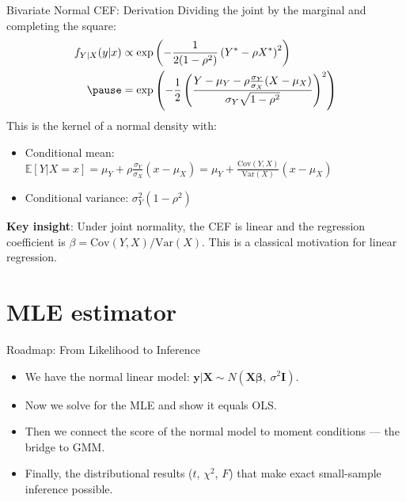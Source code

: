 \documentclass[aspectratio=169, handout, t]{beamer}
\numberwithin{equation}{section}
\begin{document}
\begin{frame}{Bivariate Normal CEF: Derivation}
Dividing the joint by the marginal and completing the square:
\begin{align*}
f_{Y|X}(y|x)&\propto \exp\left( -\frac{1}{2(1 - \rho^2)} \left( Y^* - \rho X^* \right)^2 \right)\\\pause
&= \exp\left( -\frac{1}{2} \left( \frac{Y - \mu_Y - \rho \frac{\sigma_Y}{\sigma_X}(X - \mu_X)}{\sigma_Y \sqrt{1 - \rho^2}} \right)^2 \right)
\end{align*}\pause
This is the kernel of a normal density with:
\begin{itemize}
\item Conditional mean: $\mathbb{E}[Y|X=x]=\mu_Y+\rho\frac{\sigma_Y}{\sigma_X}(x-\mu_X)=\mu_Y+\frac{\text{Cov}(Y,X)}{\text{Var}(X)}(x-\mu_X)$
\item Conditional variance: $\sigma_Y^2(1-\rho^2)$
\end{itemize}\pause
\medskip
\textbf{Key insight}: Under joint normality, the CEF is \alert{linear} and the regression coefficient is $\beta = \text{Cov}(Y,X)/\text{Var}(X)$.  This is a classical motivation for linear regression.
\end{frame}

\section{MLE estimator}

\begin{frame}{Roadmap: From Likelihood to Inference}
\begin{itemize}\setlength{\itemsep}{6pt}
\item We have the normal linear model: $\bm{y}|\bm{X}\sim N(\bm{X\beta},\ \sigma^2\bm{I})$.\pause
\item Now we solve for the MLE and show it equals OLS.\pause
\item Then we connect the \alert{score} of the normal model to moment conditions --- the bridge to GMM.\pause
\item Finally, the distributional results ($t$, $\chi^2$, $F$) that make exact small-sample inference possible.
\end{itemize}
\end{frame}
\end{document}
